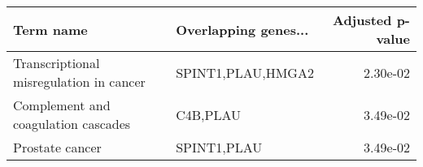 \begin{tabular}{llr}
\toprule
                              Term name & Overlapping genes... &  Adjusted p-value \\
\midrule
Transcriptional misregulation in cancer &    SPINT1,PLAU,HMGA2 &          2.30e-02 \\
    Complement and coagulation cascades &             C4B,PLAU &          3.49e-02 \\
                        Prostate cancer &          SPINT1,PLAU &          3.49e-02 \\
\bottomrule
\end{tabular}
